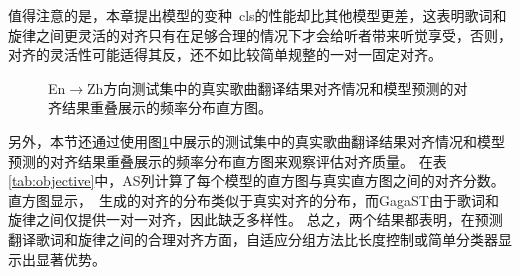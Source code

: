值得注意的是，本章提出模型的变种\modelname~cls的性能却比其他模型更差，这表明歌词和旋律之间更灵活的对齐只有在足够合理的情况下才会给听者带来听觉享受，否则，对齐的灵活性可能适得其反，还不如比较简单规整的一对一固定对齐。
\begin{figure}[ht]
    \centering
\caption{En$\rightarrow$Zh方向测试集中的真实歌曲翻译结果对齐情况和模型预测的对齐结果重叠展示的频率分布直方图。}
\label{fig:align_hist1}
\end{figure}
另外，本节还通过使用图\ref{fig:align_hist1}中展示的测试集中的真实歌曲翻译结果对齐情况和模型预测的对齐结果重叠展示的频率分布直方图来观察评估对齐质量。
在表\ref{tab:objective}中，AS列计算了每个模型的直方图与真实直方图之间的对齐分数。
直方图显示，\modelname~生成的对齐的分布类似于真实对齐的分布，而GagaST由于歌词和旋律之间仅提供一对一对齐，因此缺乏多样性。
总之，两个结果都表明，在预测翻译歌词和旋律之间的合理对齐方面，自适应分组方法比长度控制或简单分类器显示出显著优势。
